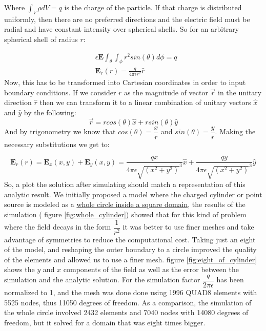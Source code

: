 Where $\int_V \rho dV = q$ is the charge of the particle. If that charge is distributed uniformly, then there are no preferred directions and the electric field must be radial \cite{Cheng1993} and have constant intensity over spherical shells. So for an arbitrary 
spherical shell of radius $r$:

\begin{align*}
&\epsilon \mathbf{E} \int_{\theta}\int_{\phi} r^2 sin(\theta) d \phi = q \\
& \mathbf{E}_r(r) = \frac{q}{4\pi \epsilon r^2} \hat{r}
\end{align*}
Now, this has to be transformed into Cartesian coordinates in order to input boundary conditions. If we consider $r$ as the magnitude of vector $\vec{r}$ in the unitary direction $\hat{r}$ then we can transform it to a linear combination of unitary vectors $\hat{x}$ and $\hat{y}$ by the following:
\begin{equation}
\vec{r} = r cos(\theta) \hat{x} + r sin(\theta) \hat{y}
\end{equation}
And by trigonometry we know that $cos(\theta) =\dfrac{x}{r}$ and $sin(\theta)=\dfrac{y}{r}$. Making the necessary substitutions we get to:

\begin{equation}
\mathbf{E}_r(r) = \mathbf{E}_x(x,y) + \mathbf{E}_y(x,y) = \frac{qx}{4\pi \epsilon \sqrt{\left(x^2+y^2\right)}^3} \hat{x}+\frac{qy}{4\pi \epsilon \sqrt{\left(x^2+y^2\right)}^3} \hat{y}
\end{equation}
So, a plot the solution after simulating should match a representation of this analytic result. We initially proposed a model where the charged cylinder or point source is modeled as a \href{https://github.com/bebopsan/peyeQM/tree/
Depuration/Lib/OOPyQM/Examples/Whole\%20cylinder}{whole circle inside a square domain}, the results of the simulation ( figure \ref{fig:whole_cylinder}) showed that for this kind of problem where the field decays in the form $\dfrac{1}{r^2}$ it was better to use finer meshes and take advantage of symmetries to reduce the computational cost. 
Taking just an eight of the model, and reshaping the outer boundary to a circle improved the quality of the elements and allowed us to use a finer mesh. figure \ref{fig:eight_of_cylinder} shows the $y$ and $x$ components of the field as well as the error between the simulation and the analytic solution.
For the simulation factor $\dfrac{q}{2\pi \epsilon}$ has been normalized to 1, and the mesh was done done using 1996 QUAD8 elements with 5525 nodes, thus 11050 degrees of freedom. As a comparison, the simulation of the whole circle involved 2432 elements and 7040 nodes with 14080 degrees of freedom, but it solved for a domain that was eight times bigger.


